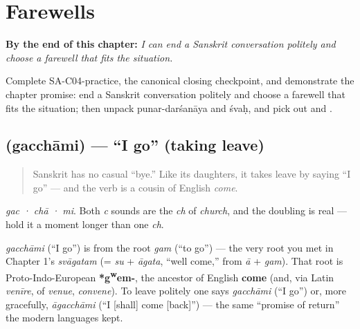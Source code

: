 
\chapter{Farewells}
\label{ch:farewells}

\begin{chapteropening}
\textbf{By the end of this chapter:} \emph{I can end a Sanskrit conversation politely and choose a farewell that fits the situation.}

Complete SA-C04-practice, the canonical closing checkpoint, and demonstrate the chapter promise: end a Sanskrit conversation politely and choose a farewell that fits the situation; then unpack punar-darśanāya and śvaḥ, and pick out  and .
\end{chapteropening}

\section[\texorpdfstring{\sk{गच्छामि} (gacchāmi)}{गच्छामि (gacchāmi)}]{ (gacchāmi) — \textquotedblleft{}I go\textquotedblright{} (taking leave)}

\label{lesson:SA-C04-gacchami}



\begin{quote}
Sanskrit has no casual \textquotedblleft{}bye.\textquotedblright{} Like its daughters, it takes leave by saying \textquotedblleft{}I go\textquotedblright{} — and the verb is a cousin of English \emph{come}.
\end{quote}

\begin{sounds}
\emph{gac · chā · mi}. Both \emph{c} sounds are the \emph{ch} of \emph{church}, and the doubling is real — hold it a moment longer than one \emph{ch}.
\end{sounds}

\begin{cousinweb}
\emph{gacchāmi} (\textquotedblleft{}I go\textquotedblright{}) is from the root \emph{gam} (\textquotedblleft{}to go\textquotedblright{}) — the very root you met in Chapter 1's \emph{svāgatam} (= \emph{su} + \emph{āgata}, \textquotedblleft{}well come,\textquotedblright{} from \emph{ā} + \emph{gam}). That root is Proto-Indo-European \textbf{*g\textsuperscript{w}em-}, the ancestor of English \textbf{come} (and, via Latin \emph{venīre}, of \emph{venue}, \emph{convene}). To leave politely one says \emph{gacchāmi} (\textquotedblleft{}I go\textquotedblright{}) or, more gracefully, \emph{āgacchāmi} (\textquotedblleft{}I {[}shall{]} come {[}back{]}\textquotedblright{}) — the same \textquotedblleft{}promise of return\textquotedblright{} the modern languages kept.
\end{cousinweb}

